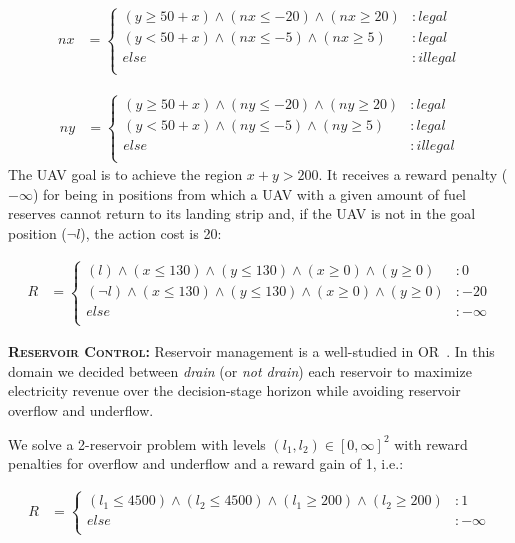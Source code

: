 {\footnotesize
\begin{align*}
nx & = \begin{cases}
(y \geq 50 + x) \wedge (nx \leq -20) \wedge (nx \geq 20) &:legal\\
(y < 50 + x) \wedge (nx \leq -5) \wedge (nx \geq 5) &:legal\\
else &: illegal\\
\end{cases}
\end{align*}}

{\footnotesize
\begin{align*}
ny & = \begin{cases}
(y \geq 50 + x) \wedge (ny \leq -20) \wedge (ny \geq 20) &:legal\\
(y < 50 + x) \wedge (ny \leq -5) \wedge (ny \geq 5) &:legal\\
else &: illegal\\
\end{cases}
\end{align*}}
The UAV goal is to achieve the region $x+y > 200$. It receives a reward penalty ($-\infty$) for being in positions  from which a UAV with a given amount of fuel reserves cannot return to its landing strip and, if the UAV is not in the goal position ($\neg l$), the action cost is 20:

{\footnotesize
\begin{align*}
R & = \begin{cases}
(l) \wedge (x \leq 130) \wedge (y \leq 130) \wedge (x \geq 0) \wedge (y \geq 0) &:0\\
(\neg l) \wedge (x \leq 130) \wedge (y \leq 130) \wedge (x \geq 0) \wedge (y \geq 0) &:-20\\
else &: -\infty\\
\end{cases}
\end{align*}}


{\bf \textsc{Reservoir Control}:} Reservoir management is a well-studied in
OR~\cite{Mahootchi2009,Yeh1985}.  In this domain we decided between
\emph{drain} (or \emph{not drain}) each reservoir to maximize
electricity revenue over the decision-stage horizon while avoiding
reservoir overflow and underflow.

We solve a 2-reservoir problem with
levels $(l_1,l_2)\in [0,\infty]^2$ with reward penalties for
overflow and underflow and a reward gain of 1, i.e.:

{\footnotesize
\begin{align*}
R & = \begin{cases}
(l_1 \leq 4500) \wedge (l_2 \leq 4500) \wedge (l_1 \geq 200) \wedge (l_2 \geq 200) &:1\\
else &: -\infty\\
\end{cases}
\end{align*}}


